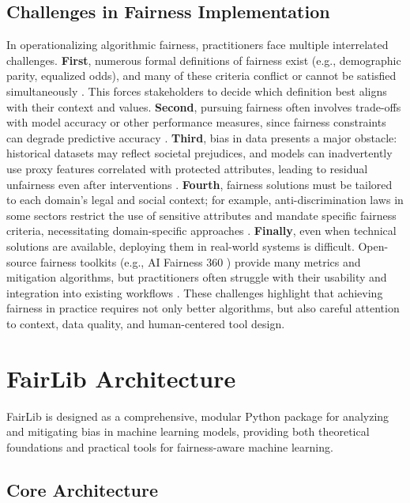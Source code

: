 \documentclass[12pt,a4paper,openright,twoside]{book}
\begin{document}
\section{Challenges in Fairness Implementation}
In operationalizing algorithmic fairness, practitioners face multiple interrelated challenges. \textbf{First}, numerous formal definitions of fairness exist (e.g., demographic parity, equalized odds), and many of these criteria conflict or cannot be satisfied simultaneously \cite{kusner2017counterfactual,xian2024unified}. This forces stakeholders to decide which definition best aligns with their context and values. \textbf{Second}, pursuing fairness often involves trade-offs with model accuracy or other performance measures, since fairness constraints can degrade predictive accuracy \cite{corbettdavies2017}. \textbf{Third}, bias in data presents a major obstacle: historical datasets may reflect societal prejudices, and models can inadvertently use proxy features correlated with protected attributes, leading to residual unfairness even after interventions \cite{barocas2016}. \textbf{Fourth}, fairness solutions must be tailored to each domain’s legal and social context; for example, anti-discrimination laws in some sectors restrict the use of sensitive attributes and mandate specific fairness criteria, necessitating domain-specific approaches \cite{veale2017}. \textbf{Finally}, even when technical solutions are available, deploying them in real-world systems is difficult. Open-source fairness toolkits (e.g., AI Fairness 360 \cite{bellamy2019aif360}) provide many metrics and mitigation algorithms, but practitioners often struggle with their usability and integration into existing workflows \cite{holstein2019,lee2021}. These challenges highlight that achieving fairness in practice requires not only better algorithms, but also careful attention to context, data quality, and human-centered tool design.

\chapter{FairLib Architecture}

FairLib is designed as a comprehensive, modular Python package for analyzing and mitigating bias in machine learning models, providing both theoretical foundations and practical tools for fairness-aware machine learning.

\section{Core Architecture}
\end{document}
